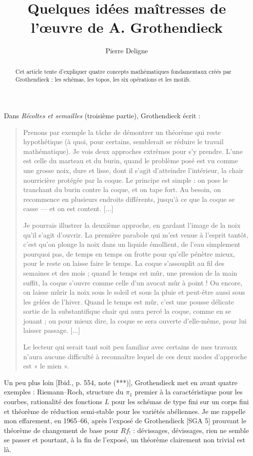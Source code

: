 \documentclass[11pt]{article}
\title{Quelques idées maîtresses de l'œuvre de A. Grothendieck}
\author{Pierre Deligne}
\date{}
\begin{document}
\maketitle

\begin{abstract}
Cet article tente d'expliquer quatre concepts mathématiques fondamentaux créés par Grothendieck : les schémas, les topos, les six opérations et les motifs.
\end{abstract}

Dans \emph{Récoltes et semailles} (troisième partie), Grothendieck écrit :
\begin{quote}
Prenons par exemple la tâche de démontrer un théorème qui reste hypothétique (à quoi, pour certains, semblerait se réduire le travail mathématique). Je vois deux approches extrêmes pour s'y prendre. L'une est celle du marteau et du burin, quand le problème posé est vu comme une grosse noix, dure et lisse, dont il s'agit d'atteindre l'intérieur, la chair nourricière protégée par la coque. Le principe est simple : on pose le tranchant du burin contre la coque, et on tape fort. Au besoin, on recommence en plusieurs endroits différents, jusqu'à ce que la coque se casse — et on est content. [...]

Je pourrais illustrer la deuxième approche, en gardant l'image de la noix qu'il s'agit d'ouvrir. La première parabole qui m'est venue à l'esprit tantôt, c'est qu'on plonge la noix dans un liquide émollient, de l'eau simplement pourquoi pas, de temps en temps on frotte pour qu'elle pénètre mieux, pour le reste on laisse faire le temps. La coque s'assouplit au fil des semaines et des mois ; quand le temps est mûr, une pression de la main suffit, la coque s'ouvre comme celle d'un avocat mûr à point ! Ou encore, on laisse mûrir la noix sous le soleil et sous la pluie et peut-être aussi sous les gelées de l'hiver. Quand le temps est mûr, c'est une pousse délicate sortie de la substantifique chair qui aura percé la coque, comme en se jouant ; ou pour mieux dire, la coque se sera ouverte d'elle-même, pour lui laisser passage. [...]

Le lecteur qui serait tant soit peu familiar avec certains de mes travaux n'aura aucune difficulté à reconnaître lequel de ces deux modes d'approche est « le mien ».
\end{quote}

Un peu plus loin [Ibid., p. 554, note (***)], Grothendieck met en avant quatre exemples : Riemann--Roch, structure du \(\pi_1\) premier à la caractéristique pour les courbes, rationalité des fonctions \(L\) pour les schémas de type fini sur un corps fini et théorème de réduction semi-stable pour les variétés abéliennes. Je me rappelle mon effarement, en 1965--66, après l'exposé de Grothendieck [SGA 5] prouvant le théorème de changement de base pour \(Rf_!\) : dévissages, dévissages, rien ne semble se passer et pourtant, à la fin de l'exposé, un théorème clairement non trivial est là.
\end{document}
